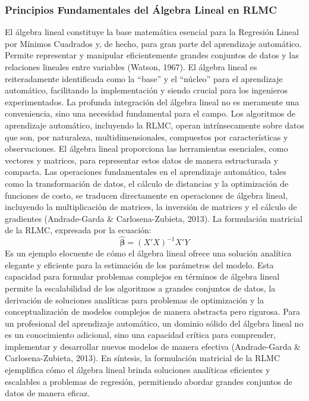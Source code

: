 \documentclass[12pt]{article}
\begin{document}
        \subsubsection*{Principios Fundamentales del Álgebra Lineal en RLMC}
        El álgebra lineal constituye la base matemática esencial para la Regresión Lineal por Mínimos Cuadrados y, de hecho, para gran parte del aprendizaje automático. Permite representar y manipular eficientemente grandes conjuntos de datos y las relaciones lineales entre variables (Watson, 1967). El álgebra lineal es reiteradamente identificada como la “base” y el “núcleo” para el aprendizaje automático, facilitando la implementación y siendo crucial para los ingenieros experimentados. La profunda integración del álgebra lineal no es meramente una conveniencia, sino una necesidad fundamental para el campo. Los algoritmos de aprendizaje automático, incluyendo la RLMC, operan intrínsecamente sobre datos que son, por naturaleza, multidimensionales, compuestos por características y observaciones. El álgebra lineal proporciona las herramientas esenciales, como vectores y matrices, para representar estos datos de manera estructurada y compacta. Las operaciones fundamentales en el aprendizaje automático, tales como la transformación de datos, el cálculo de distancias y la optimización de funciones de costo, se traducen directamente en operaciones de álgebra lineal, incluyendo la multiplicación de matrices, la inversión de matrices y el cálculo de gradientes (Andrade-Garda \& Carlosena-Zubieta, 2013).
        \newline
        \newline
        La formulación matricial de la RLMC, expresada por la ecuación:
        \[
        \hat{\bm{\beta}} = (X'X)^{-1} X'Y
        \]
        Es un ejemplo elocuente de cómo el álgebra lineal ofrece una solución analítica elegante y eficiente para la estimación de los parámetros del modelo. Esta capacidad para formular problemas complejos en términos de álgebra lineal permite la escalabilidad de los algoritmos a grandes conjuntos de datos, la derivación de soluciones analíticas para problemas de optimización y la conceptualización de modelos complejos de manera abstracta pero rigurosa. Para un profesional del aprendizaje automático, un dominio sólido del álgebra lineal no es un conocimiento adicional, sino una capacidad crítica para comprender, implementar y desarrollar nuevos modelos de manera efectiva (Andrade-Garda \& Carlosena-Zubieta, 2013).
        \newline
        \newline
        \noindent
        En síntesis, la formulación matricial de la RLMC ejemplifica cómo el álgebra lineal brinda soluciones analíticas eficientes y escalables a problemas de regresión, permitiendo abordar grandes conjuntos de datos de manera eficaz.
        
\end{document}

